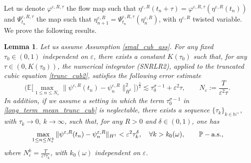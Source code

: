 \documentclass[a4paper]{amsart}
\newtheorem{lemma}[theorem]{Lemma}
\begin{document}
Let us denote $\varphi^{\varepsilon,R,\tau}$ the flow map such that $\eta^{\varepsilon,R}(t_n+\tau)=\varphi^{\varepsilon,R,\tau}(\eta^{\varepsilon,R}(t_n))$ and $\Psi^{\varepsilon,R,\tau}_{t_n}$ the map such that $\eta^{\varepsilon,R}_{n+1}=\Psi_{t_n}^{\varepsilon,R,\tau}(\eta^{\varepsilon,R}_n)$, with $\eta^{\varepsilon,R}$ twisted variable.
We prove the following results.
\begin{lemma}
\label{long_term_cub_trunc}
    Let us assume Assumption \ref{smal_cub_ass}. For any fixed $\tau_0\in(0,1)$ independent on $\varepsilon$, there exists a constant $K(\tau_0)$ such that, for any $\tau\in(0,K(\tau_0))$, the numerical integrator (SNRLR2), applied to the truncated cubic equation \eqref{trunc_cub2}, satisfies the following error estimate
    \begin{equation}
        \label{long_term_mean_trunc_cub}
    \big(\mathbb{E}\big[\max_{1\le n\le N_\varepsilon}\|\psi^{\varepsilon,R}(t_n)-\psi^{\varepsilon,R}_n\|^2_{H^1}\big]\big)^{\frac{1}{2}}\lesssim\tau_0^{\sigma-1}+\varepsilon^2\tau, \qquad N_\varepsilon:=\frac{T}{\varepsilon^2 \tau}.
    \end{equation}
    In addition, if we assume a setting in which the term $\tau_0^{\sigma-1}$ in \eqref{long_term_mean_trunc_cub} is neglectable, there exists a sequence $\{\tau_k\}_{k\in\mathbb{N}^+}$, with $\tau_k\to 0, \ k\to \infty$, such that, for any $R>0$ and $\delta\in(0,1)$, one has
    \begin{equation}
        \label{long_term_path_trunc_cub}
        \max_{1\le n\le N^k_\varepsilon}\|\psi^{\varepsilon,R}(t_n)-\psi^{\varepsilon,R}_n\|_{H^1}<\varepsilon^2 \tau_k^\delta, \quad \forall k>k_0(\omega), \qquad \mathbb{P}-{\rm a.s.},
    \end{equation}
    where $N_\varepsilon^k=\frac{T}{\varepsilon^2 \tau_k}$, with $k_0(\omega)$ independent on $\varepsilon$.
\end{lemma}
\end{document}
